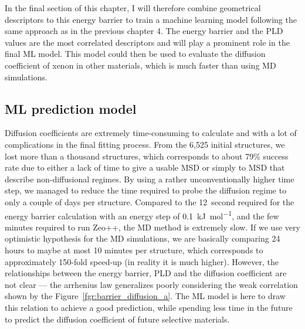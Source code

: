 \documentclass[main]{subfiles}
\begin{document}
In the final section of this chapter, I will therefore combine geometrical descriptors to this energy barrier to train a machine learning model following the same approach as in the previous chapter 4. The energy barrier and the PLD values are the most correlated descriptors and will play a prominent role in the final ML model. This model could then be used to evaluate the diffusion coefficient of xenon in other materials, which is much faster than using MD simulations.

\subsection{ML prediction model}

Diffusion coefficients are extremely time-consuming to calculate and with a lot of complications in the final fitting process. From the 6,525 initial structures, we lost more than a thousand structures, which corresponds to about 79\% success rate due to either a lack of time to give a usable MSD or simply to MSD that describe non-diffusional regimes. By using a rather unconventionally higher time step, we managed to reduce the time required to probe the diffusion regime to only a couple of days per structure. Compared to the \SI{12}{second} required for the energy barrier calculation with an energy step of \SI{0.1}{\kJ\per\mol}, and the few minutes required to run Zeo++, the MD method is extremely slow. If we use very optimistic hypothesis for the MD simulations, we are basically comparing 24 hours to maybe at most 10 minutes per structure, which corresponds to approximately 150-fold speed-up (in reality it is much higher). However, the relationships between the energy barrier, PLD and the diffusion coefficient are not clear --- the arrhenius law generalizes poorly considering the weak correlation shown by the Figure~\ref{fgr:barrier_diffusion_a}. The ML model is here to draw this relation to achieve a good prediction, while spending less time in the future to predict the diffusion coefficient of future selective materials.
\end{document}
